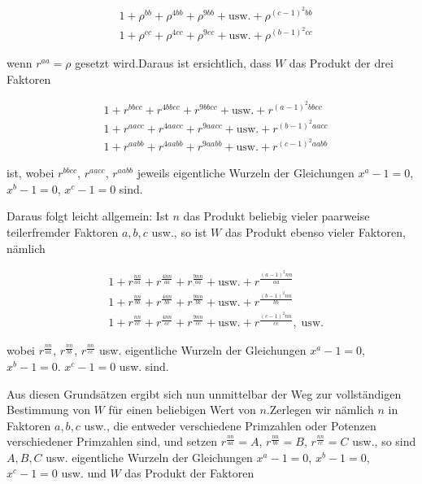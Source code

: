 \[
\begin{aligned}
&1+\rho^{bb}+\rho^{4bb}+\rho^{9bb}+\text{usw.}+\rho^{(c-1)^2bb}\\
&1+\rho^{cc}+\rho^{4cc}+\rho^{9cc}+\text{usw.}+\rho^{(b-1)^2cc}
\end{aligned}
\]

wenn $r^{aa}=\rho$ gesetzt wird.\quad Daraus ist ersichtlich, dass $W$ das Produkt der drei Faktoren

\[
\begin{aligned}
&1+r^{bbcc}+r^{4bbcc}+r^{9bbcc}+\text{usw.}+r^{(a-1)^2bbcc}\\
&1+r^{aacc}+r^{4aacc}+r^{9aacc}+\text{usw.}+r^{(b-1)^2aacc}\\
&1+r^{aabb}+r^{4aabb}+r^{9aabb}+\text{usw.}+r^{(c-1)^2aabb}
\end{aligned}
\]

ist, wobei $r^{bbcc}$, $r^{aacc}$, $r^{aabb}$ jeweils eigentliche Wurzeln der Gleichungen $x^a-1=0$, $x^b-1=0$, $x^c-1=0$ sind.


Daraus folgt leicht allgemein: Ist $n$ das Produkt beliebig vieler paarweise teilerfremder Faktoren $a,b,c$ usw., so ist $W$ das Produkt ebenso vieler Faktoren, nämlich

\[
\begin{aligned}
&1+r^{\frac{nn}{aa}}+r^{\frac{4nn}{aa}}+r^{\frac{9nn}{aa}}+\text{usw.}+r^{\frac{(a-1)^2nn}{aa}}\\
&1+r^{\frac{nn}{bb}}+r^{\frac{4nn}{bb}}+r^{\frac{9nn}{bb}}+\text{usw.}+r^{\frac{(b-1)^2nn}{bb}}\\
&1+r^{\frac{nn}{cc}}+r^{\frac{4nn}{cc}}+r^{\frac{9nn}{cc}}+\text{usw.}+r^{\frac{(c-1)^2nn}{cc}},\;\text{usw.}
\end{aligned}
\]

wobei $r^{\frac{nn}{aa}}$, $r^{\frac{nn}{bb}}$, $r^{\frac{nn}{cc}}$ usw. eigentliche Wurzeln der Gleichungen $x^a-1=0$, $x^b-1=0$. $x^c-1=0$ usw. sind.


Aus diesen Grundsätzen ergibt sich nun unmittelbar der Weg zur vollständigen Bestimmung von $W$ für einen beliebigen Wert von $n$.\quad Zerlegen wir nämlich $n$ in Faktoren
$a,b,c$ usw., die entweder verschiedene Primzahlen oder Potenzen verschiedener Primzahlen sind, und setzen $r^{\frac{nn}{aa}}=A$, $r^{\frac{nn}{bb}}=B$, $r^{\frac{nn}{cc}}=C$ usw., so sind $A,B,C$ usw. eigentliche Wurzeln der Gleichungen $x^a-1=0$, $x^b-1=0$, $x^c-1=0$ usw. und $W$ das Produkt der Faktoren

